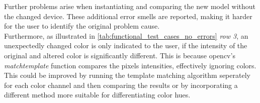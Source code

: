 Further problems arise when instantiating and comparing the new model without the changed device. These additional error smells are reported, making it harder for the user to identify the original problem cause.\\
Furthermore, as illustrated in \autoref{tab:functional_test_cases_no_errors} \textit{row 3}, an unexpectedly changed color is only indicated to the user, if the intensity of the original and altered color is significantly different. This is because \acrshort{opencv}'s \textit{matchtemplate} function compares the pixels intensities, effectively ignoring colors. This could be improved by running the template matching algorithm seperately for each color channel and then comparing the results or by incorporating a different method more suitable for differentiating color hues.

